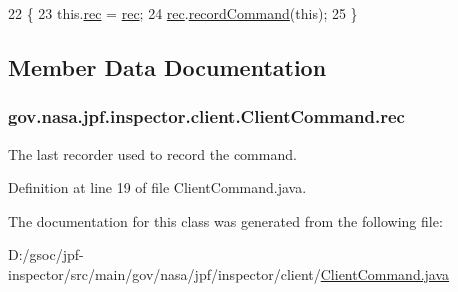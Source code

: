 \begin{DoxyCode}
22                                                   \{
23     this.\hyperlink{classgov_1_1nasa_1_1jpf_1_1inspector_1_1client_1_1_client_command_af4246f2427035c72a6af45a2c61361f7}{rec} = \hyperlink{classgov_1_1nasa_1_1jpf_1_1inspector_1_1client_1_1_client_command_af4246f2427035c72a6af45a2c61361f7}{rec};
24     \hyperlink{classgov_1_1nasa_1_1jpf_1_1inspector_1_1client_1_1_client_command_af4246f2427035c72a6af45a2c61361f7}{rec}.\hyperlink{classgov_1_1nasa_1_1jpf_1_1inspector_1_1client_1_1_command_recorder_af5f212124179773e46c8b45f1d01a32d}{recordCommand}(\textcolor{keyword}{this});
25   \}
\end{DoxyCode}


\subsection{Member Data Documentation}
\subsubsection[{\texorpdfstring{rec}{rec}}]{ gov.\+nasa.\+jpf.\+inspector.\+client.\+Client\+Command.\+rec\hspace{0.3cm}{\ttfamily [protected]}}\hypertarget{classgov_1_1nasa_1_1jpf_1_1inspector_1_1client_1_1_client_command_af4246f2427035c72a6af45a2c61361f7}{}\label{classgov_1_1nasa_1_1jpf_1_1inspector_1_1client_1_1_client_command_af4246f2427035c72a6af45a2c61361f7}


The last recorder used to record the command. 



Definition at line 19 of file Client\+Command.\+java.



The documentation for this class was generated from the following file\+:\begin{DoxyCompactItemize}
\item 
D\+:/gsoc/jpf-\/inspector/src/main/gov/nasa/jpf/inspector/client/\hyperlink{_client_command_8java}{Client\+Command.\+java}\end{DoxyCompactItemize}
